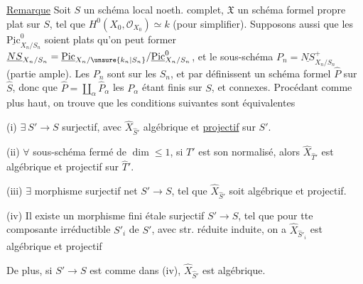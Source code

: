 \uline{Remarque}  Soit $S$  un schéma local noeth. complet,
$\mathfrak X$ un schéma formel propre  plat sur $S$,
tel que $H^0(X_0,\mathcal O_{X_0})\simeq k$ (pour simplifier). Supposons
aussi  que 
les $\underline{\mathrm{Pic}}^0_{X_n/S_n}$ soient plats    qu'on
peut former $\underline{NS}_{X_n/S_n}=\underline{\mathrm{Pic}}_{X_n/\unsure{k_n|S_n}}/\underline{\mathrm{Pic}}^0_{X_n/S_n}$, et
le sous-schéma $P_n=\underline{NS}_{X_n/S_n}^{+}$ (partie ample).
Les $P_n$ sont   sur les $S_n$, et par 
 définissent un schéma formel $\widehat P$ sur $\widehat S$,
donc que $\widehat P=\coprod_{\alpha}\widehat P_\alpha$
les $P_\alpha$ étant finis  sur $S$, et connexes. Procédant
comme plus haut, on trouve que les conditions suivantes
sont équivalentes

(i) $\exists\ S'\to S$   surjectif,  avec $\widehat X_{\widehat S'}$ algébrique
et \uline{projectif} sur $S'$.

(ii) $\forall$ sous-schéma fermé  de $\dim\leq 1$, si $T'$ est son normalisé,
alors $\widehat X_{\widehat T'}$ est algébrique et projectif sur $\widehat T'$.

(iii) $\exists$ morphisme  surjectif net $S'\to S$, tel que
$\widehat X_{\widehat S'}$ soit algébrique et projectif.

(iv) Il existe un morphisme fini étale surjectif $S'\to S$, tel que pour tte composante irréductible
$S'_i$ de $S'$, avec str. réduite induite, on a $\widehat X_{\widehat S'_i}$ est
algébrique et projectif

 De
plus, si $S'\to S$ est comme dans (iv), $\widehat X_{\widehat S'}$ est algébrique.
